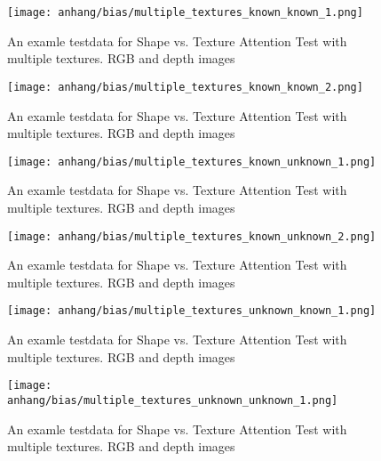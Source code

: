 	\begin{figure}[H]
		\centering
		\texttt{[image: anhang/bias/multiple\_textures\_known\_known\_1.png]}
		\caption[An examle testdata for Shape vs. Texture Attention Test with multiple textures. RGB and depth images]{An examle testdata for Shape vs. Texture Attention Test with multiple textures. RGB and depth images}
	\end{figure}
	\begin{figure}[H]
		\centering
		\texttt{[image: anhang/bias/multiple\_textures\_known\_known\_2.png]}
		\caption[An examle testdata for Shape vs. Texture Attention Test with multiple textures. RGB and depth images]{An examle testdata for Shape vs. Texture Attention Test with multiple textures. RGB and depth images}
	\end{figure}
	\begin{figure}[H]
		\centering
		\texttt{[image: anhang/bias/multiple\_textures\_known\_unknown\_1.png]}
		\caption[An examle testdata for Shape vs. Texture Attention Test with multiple textures. RGB and depth images]{An examle testdata for Shape vs. Texture Attention Test with multiple textures. RGB and depth images}
	\end{figure}
	\begin{figure}[H]
		\centering
		\texttt{[image: anhang/bias/multiple\_textures\_known\_unknown\_2.png]}
		\caption[An examle testdata for Shape vs. Texture Attention Test with multiple textures. RGB and depth images]{An examle testdata for Shape vs. Texture Attention Test with multiple textures. RGB and depth images}
	\end{figure}
	\begin{figure}[H]
		\centering
		\texttt{[image: anhang/bias/multiple\_textures\_unknown\_known\_1.png]}
		\caption[An examle testdata for Shape vs. Texture Attention Test with multiple textures. RGB and depth images]{An examle testdata for Shape vs. Texture Attention Test with multiple textures. RGB and depth images}
	\end{figure}
	\begin{figure}[H]
		\centering
		\texttt{[image: anhang/bias/multiple\_textures\_unknown\_unknown\_1.png]}
		\caption[An examle testdata for Shape vs. Texture Attention Test with multiple textures. RGB and depth images]{An examle testdata for Shape vs. Texture Attention Test with multiple textures. RGB and depth images}
	\end{figure}
	
